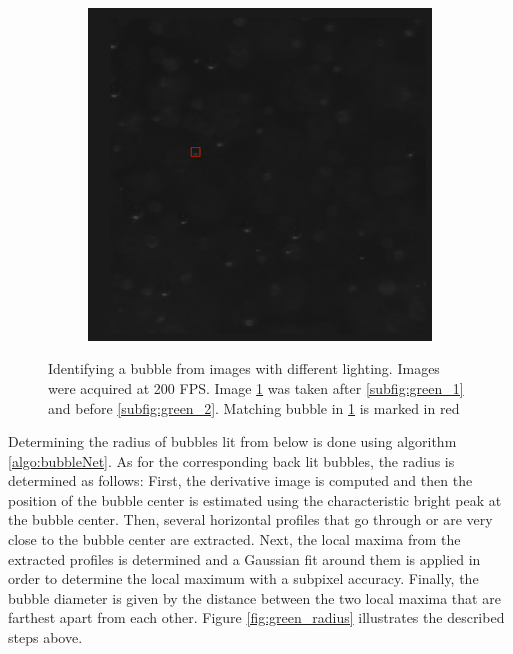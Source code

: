 \begin{figure}
				\begin{subfigure}[t]{.55\textwidth}
					\centering
					\includegraphics[scale=0.45]{images/tracking_red.png}
					\caption{}
					\label{subfig:red}
				\end{subfigure}
								
					\caption{Identifying a bubble from images with different lighting. Images were acquired at 200 FPS. Image \ref{subfig:red} was taken after \ref{subfig:green_1} and before \ref{subfig:green_2}. Matching bubble in \ref{subfig:red} is marked in red }
					\label{fig:radius_calib_demo}
			\end{figure}
			
			
			Determining the radius of bubbles lit from below is done using algorithm \ref{algo:bubbleNet}. As for the corresponding back lit bubbles, the radius is determined as follows:
			First, the derivative image is computed and then the position of the bubble center is estimated using the characteristic bright peak at the bubble center. Then, several horizontal profiles that go through or are very close to the bubble center are extracted. Next, the local maxima from the extracted profiles is determined and a Gaussian fit around them is applied in order to determine the local maximum with a subpixel accuracy. Finally, the bubble diameter is given by the distance between the two local maxima that are farthest apart from each other. Figure \ref{fig:green_radius} illustrates the described steps above. 
			
